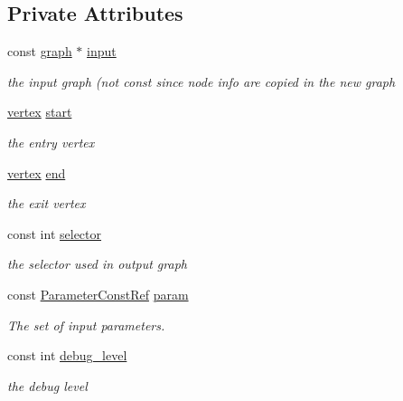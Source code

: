 \subsection*{Private Attributes}
\begin{DoxyCompactItemize}
\item 
const \hyperlink{structgraph}{graph} $\ast$ \hyperlink{classweak__dominance_a6d2d93153e9a80597ccb97bd40e6a968}{input}
\begin{DoxyCompactList}\small\item\em the input graph (not const since node info are copied in the new graph \end{DoxyCompactList}\item 
\hyperlink{graph_8hpp_abefdcf0544e601805af44eca032cca14}{vertex} \hyperlink{classweak__dominance_a76b8a4cd058367c57e84d8f83f259722}{start}
\begin{DoxyCompactList}\small\item\em the entry vertex \end{DoxyCompactList}\item 
\hyperlink{graph_8hpp_abefdcf0544e601805af44eca032cca14}{vertex} \hyperlink{classweak__dominance_abce743ae8d9bfcbe54818555e9d3b3a0}{end}
\begin{DoxyCompactList}\small\item\em the exit vertex \end{DoxyCompactList}\item 
const int \hyperlink{classweak__dominance_a9d12594778b1fb4868e1a26bfdba53b8}{selector}
\begin{DoxyCompactList}\small\item\em the selector used in output graph \end{DoxyCompactList}\item 
const \hyperlink{Parameter_8hpp_a37841774a6fcb479b597fdf8955eb4ea}{Parameter\+Const\+Ref} \hyperlink{classweak__dominance_a5d3a2749ddef3b503fa43d8fb3a1c2fe}{param}
\begin{DoxyCompactList}\small\item\em The set of input parameters. \end{DoxyCompactList}\item 
const int \hyperlink{classweak__dominance_a44dd8f13a4b8167976ec43dcde3be35b}{debug\+\_\+level}
\begin{DoxyCompactList}\small\item\em the debug level \end{DoxyCompactList}\end{DoxyCompactItemize}


